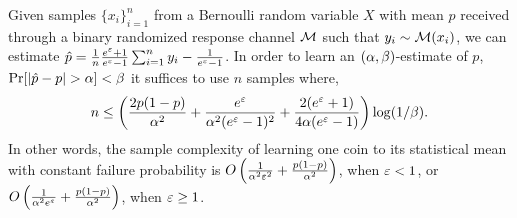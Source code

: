 \begin{lemma} 
\label{lemma: one-coin-statistical-mean}
    Given samples $\{x_i\}_{i=1}^n$ from a Bernoulli random variable $X$ with mean $p$ received through a binary randomized response channel $\mathcal{M}$ such that $y_i\sim \mathcal{M}(x_i)$, we can estimate $\hat{p}=\frac{1}{n}\frac{e^\varepsilon + 1}{e^\varepsilon - 1}\sum_{i=1}^n y_i - \frac{1}{e^\varepsilon - 1}$. In order to learn an $(\alpha,\beta)$-estimate of $p$, $\Pr[|\hat{p}-p|>\acc]<\failp$ it suffices to use $n$ samples where,
    $$
    n\leq\left(\frac{2p(1-p)}{\alpha^2} + \frac{e^\varepsilon}{\alpha^2(e^\varepsilon - 1)^2} + \frac{2(e^\varepsilon + 1)}{4\alpha(e^\varepsilon - 1)}\right)\log(1/\beta).
    $$
    In other words, the sample complexity of learning one coin to its statistical mean with constant failure probability is $O\left(\frac{1}{\alpha^2\varepsilon^2} +\frac{p(1-p)}{\alpha^2}\right)$, when $\varepsilon<1$, or $O\left(\frac{1}{\alpha^2e^\varepsilon} +\frac{p(1-p)}{\alpha^2}\right)$, when $\varepsilon\geq 1$.
\end{lemma}
